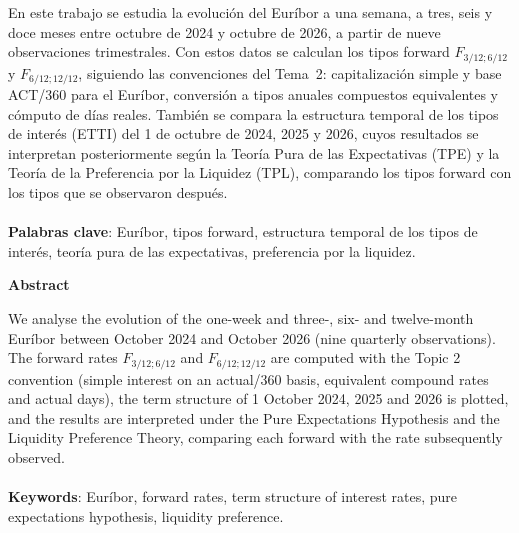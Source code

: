\documentclass[a4paper,12pt]{article}
\newcommand{\Fw}[2]{F_{#1;#2}}
\begin{document}
\begin{titlepage}
\vspace{0.1cm}
\noindent
\begin{justify}
En este trabajo se estudia la evolución del Euríbor a una semana, a tres, seis y doce meses entre octubre de 2024 y octubre de 2026, a partir de nueve observaciones trimestrales. Con estos datos se calculan los tipos forward $\Fw{3/12}{6/12}$ y $\Fw{6/12}{12/12}$, siguiendo las convenciones del Tema~2: capitalización simple y base ACT/360 para el Euríbor, conversión a tipos anuales compuestos equivalentes y cómputo de días reales. También se compara la estructura temporal de los tipos de interés (ETTI) del 1 de octubre de 2024, 2025 y 2026, cuyos resultados se interpretan posteriormente según la Teoría Pura de las Expectativas (TPE) y la Teoría de la Preferencia por la Liquidez (TPL), comparando los tipos forward con los tipos que se observaron después.
\\\\
\vspace{0.1cm}
\noindent
\textbf{Palabras clave}: Euríbor, tipos forward, estructura temporal de los tipos de interés, teoría pura de las expectativas, preferencia por la liquidez.
\end{justify}
\begin{center}
    {\bfseries Abstract}
\end{center}
\vspace{0.1cm}
\noindent
\begin{justify}
We analyse the evolution of the one-week and three-, six- and twelve-month Euríbor between October 2024 and October 2026 (nine quarterly observations). The forward rates $\Fw{3/12}{6/12}$ and $\Fw{6/12}{12/12}$ are computed with the Topic 2 convention (simple interest on an actual/360 basis, equivalent compound rates and actual days), the term structure of 1 October 2024, 2025 and 2026 is plotted, and the results are interpreted under the Pure Expectations Hypothesis and the Liquidity Preference Theory, comparing each forward with the rate subsequently observed.\\\\
\vspace{0.1cm}
\noindent
\textbf{Keywords}: Euríbor, forward rates, term structure of interest rates, pure expectations hypothesis, liquidity preference.
\end{justify}

\end{titlepage}

\newpage{}
\renewcommand{\contentsname}{Índice}
\tableofcontents
\end{document}
